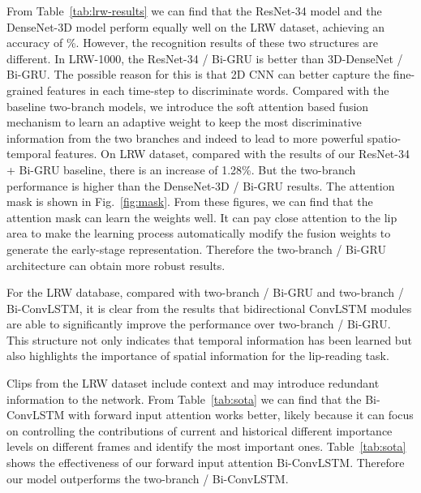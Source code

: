 \documentclass{bmvc2k}
\begin{document}
From Table~\ref{tab:lrw-results} we can find that the ResNet-34 model and the DenseNet-3D model perform equally well on the LRW dataset, achieving an accuracy of \%. However, the recognition results of these two structures are different. In LRW-1000, the ResNet-34 / Bi-GRU is better than 3D-DenseNet / Bi-GRU. The possible reason for this is that 2D CNN can better capture the fine-grained features in each time-step to discriminate words. Compared with the baseline two-branch models, we introduce the soft attention based fusion mechanism to learn an adaptive weight to keep the most discriminative information from the two branches and indeed to lead to more powerful spatio-temporal features. On LRW dataset, compared with the results of our ResNet-34 + Bi-GRU baseline, there is an increase of 1.28\%. But the two-branch performance is higher than the DenseNet-3D / Bi-GRU results. The attention mask is shown in Fig.~\ref{fig:mask}. From these figures, we can find that the attention mask can learn the weights well. It can pay close attention to the lip area to make the learning process automatically modify the fusion weights to generate the early-stage representation. Therefore the two-branch / Bi-GRU architecture can obtain more robust results. 


For the LRW database, compared with two-branch / Bi-GRU and two-branch / Bi-ConvLSTM, it is clear from the results that bidirectional ConvLSTM modules are able to significantly improve the performance over two-branch / Bi-GRU. This structure not only indicates that temporal information has been learned but also highlights the importance of spatial information for the lip-reading task.  

Clips from the LRW dataset include context and may introduce redundant information to the network. From Table~\ref{tab:sota} we can find that the Bi-ConvLSTM with forward input attention works better, likely because it can focus on controlling the contributions of current and historical different importance levels on different frames and identify the most important ones. Table~\ref{tab:sota} shows the effectiveness of our forward input attention Bi-ConvLSTM. Therefore our model outperforms the two-branch / Bi-ConvLSTM.
\end{document}

